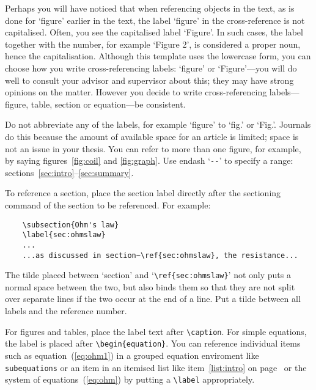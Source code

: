 \documentclass[english, 12pt, a4paper, sci, utf8, a-2b, online]{aaltothesis}
\begin{document}
Perhaps you will have noticed that when referencing objects in the text, as is 
done for `figure' earlier in the text, the label ‘figure’ in the cross-reference
is not capitalised. Often, you see the capitalised label ‘Figure’. In such 
cases, the label together with the number, for example ‘Figure 2’, is 
considered a proper noun, hence the capitalisation. Although this template uses 
the lowercase form, you can choose how you write cross-referencing labels: 
‘figure’ or ‘Figure’---you will do well to consult your advisor and supervisor 
about this; they may have strong opinions on the matter. However you decide to 
write cross-referencing labels---figure, table, section or equation---be 
consistent.

Do not abbreviate any of the labels, for example ‘figure’ to ‘fig.’ or ‘Fig.’. 
Journals do this because the amount of available space for an article is 
limited; space is not an issue in your thesis. You can refer to more than one 
figure, for example, by saying figures~\ref{fig:coil} and \ref{fig:graph}. Use 
endash `\verb+--+' to specify a range: sections~\ref{sec:intro}--\ref{sec:summary}.

To reference a section, place the section label directly after the sectioning 
command of the section to be referenced. For example:
\begin{verbatim}
	\subsection{Ohm's law}
	\label{sec:ohmslaw}
	...
	...as discussed in section~\ref{sec:ohmslaw}, the resistance...
\end{verbatim}
The tilde placed between `section' and `\verb+\ref{sec:ohmslaw}+' not only puts 
a normal space between the two, but also binds them so that they are not split 
over separate lines if the two occur at the end of a line. Put a tilde between 
all labels and the reference number.

For figures and tables, place the label text after \verb+\caption+. For simple 
equations, the label is placed after \verb+\begin{equation}+. You can reference
individual items such as equation~(\ref{eq:ohm1}) in a grouped equation 
enviroment like \verb+subequations+ or an item in an itemised list like 
item~\ref{list:intro} on page~\pageref{list:intro} or the system of 
equations~(\ref{eq:ohm}) by putting a \verb+\label+ appropriately.
\end{document}
